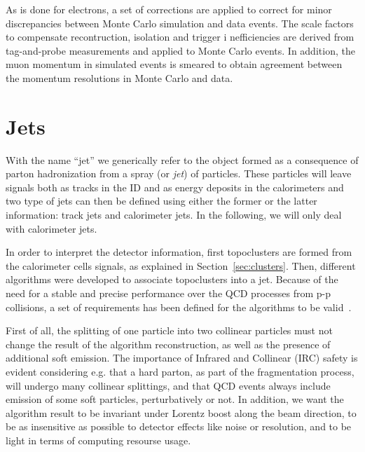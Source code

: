As is done for electrons, a set of corrections are applied to correct for minor
discrepancies between Monte Carlo simulation and data events.
The scale factors to compensate recontruction, isolation and trigger i
nefficiencies are derived from tag-and-probe measurements
and applied to Monte Carlo events. In addition, the muon momentum
in simulated events is smeared to obtain agreement between the momentum
resolutions in Monte Carlo and data.


\section{Jets}\label{sec:jets}

With the name ``jet'' we generically refer to the object formed as a consequence
of parton hadronization from a spray (or {\it jet}) of particles. These particles
will leave signals both as tracks in the ID and as energy deposits in the calorimeters
and two type of jets can then be defined using either the former or the latter information:
track jets and calorimeter jets. In the following, we will only deal with calorimeter jets.

In order to interpret the detector information, first topoclusters are formed from the
calorimeter cells signals, as explained in Section~\ref{sec:clusters}. Then, different
algorithms were developed to associate topoclusters into a jet. Because of the
need for a stable and precise performance over the QCD processes from p-p collisions,
a set of requirements has been defined for the algorithms to be valid~\cite{Salam:2009jx}.

First of all, the splitting of one particle into two collinear particles must not change the 
result of the algorithm reconstruction, as well as the presence of additional soft emission.
The importance of Infrared and Collinear (IRC) safety is evident considering e.g. 
that a hard parton, as part of the fragmentation process, will undergo many collinear splittings,
and that QCD events always include emission of some soft particles, perturbatively or not.
In addition, we want the algorithm result to be invariant under Lorentz boost along the beam direction,
to be as insensitive as possible to detector effects like noise or resolution, and to be light in terms
of computing resourse usage.

